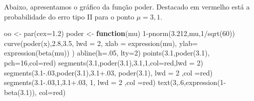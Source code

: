 \documentclass[
  letterpaper,
  DIV=11,
  numbers=noendperiod]{scrartcl}
\newenvironment{Shaded}{\begin{snugshade}}{\end{snugshade}}
\newcommand{\AttributeTok}[1]{\textcolor[rgb]{0.40,0.45,0.13}{#1}}
\newcommand{\ControlFlowTok}[1]{\textcolor[rgb]{0.00,0.23,0.31}{\textbf{#1}}}
\newcommand{\DecValTok}[1]{\textcolor[rgb]{0.68,0.00,0.00}{#1}}
\newcommand{\FloatTok}[1]{\textcolor[rgb]{0.68,0.00,0.00}{#1}}
\newcommand{\FunctionTok}[1]{\textcolor[rgb]{0.28,0.35,0.67}{#1}}
\newcommand{\NormalTok}[1]{\textcolor[rgb]{0.00,0.23,0.31}{#1}}
\newcommand{\OtherTok}[1]{\textcolor[rgb]{0.00,0.23,0.31}{#1}}
\newcommand{\SpecialCharTok}[1]{\textcolor[rgb]{0.37,0.37,0.37}{#1}}
\newcommand{\StringTok}[1]{\textcolor[rgb]{0.13,0.47,0.30}{#1}}
\begin{document}
Abaixo, apresentamos o gráfico da função poder. Destacado em vermelho
está a probabilidade do erro tipo II para o ponto \(\mu=3,1\).

\begin{Shaded}
\begin{Highlighting}[]
\NormalTok{oo }\OtherTok{\textless{}{-}} \FunctionTok{par}\NormalTok{(}\AttributeTok{cex=}\FloatTok{1.2}\NormalTok{)}
\NormalTok{poder }\OtherTok{\textless{}{-}} \ControlFlowTok{function}\NormalTok{(mu) }\DecValTok{1}\SpecialCharTok{{-}}\FunctionTok{pnorm}\NormalTok{(}\FloatTok{3.212}\NormalTok{,mu,}\DecValTok{1}\SpecialCharTok{/}\FunctionTok{sqrt}\NormalTok{(}\DecValTok{60}\NormalTok{))}
\FunctionTok{curve}\NormalTok{(}\FunctionTok{poder}\NormalTok{(x),}\FloatTok{2.8}\NormalTok{,}\FloatTok{3.5}\NormalTok{, }\AttributeTok{lwd =} \DecValTok{2}\NormalTok{, }\AttributeTok{xlab =} \FunctionTok{expression}\NormalTok{(mu), }\AttributeTok{ylab=} \FunctionTok{expression}\NormalTok{(}\FunctionTok{beta}\NormalTok{(mu)) )}
\FunctionTok{abline}\NormalTok{(}\AttributeTok{h=}\NormalTok{.}\DecValTok{05}\NormalTok{, }\AttributeTok{lty=}\DecValTok{2}\NormalTok{)}
\FunctionTok{points}\NormalTok{(}\FloatTok{3.1}\NormalTok{,}\FunctionTok{poder}\NormalTok{(}\FloatTok{3.1}\NormalTok{), }\AttributeTok{pch=}\DecValTok{16}\NormalTok{,}\AttributeTok{col=}\StringTok{\textquotesingle{}red\textquotesingle{}}\NormalTok{)}
\FunctionTok{segments}\NormalTok{(}\FloatTok{3.1}\NormalTok{,}\FunctionTok{poder}\NormalTok{(}\FloatTok{3.1}\NormalTok{),}\FloatTok{3.1}\NormalTok{,}\DecValTok{1}\NormalTok{,}\AttributeTok{col=}\StringTok{\textquotesingle{}red\textquotesingle{}}\NormalTok{,}\AttributeTok{lwd =} \DecValTok{2}\NormalTok{)}
\FunctionTok{segments}\NormalTok{(}\FloatTok{3.1{-}.03}\NormalTok{,}\FunctionTok{poder}\NormalTok{(}\FloatTok{3.1}\NormalTok{),}\FloatTok{3.1+.03}\NormalTok{, }\FunctionTok{poder}\NormalTok{(}\FloatTok{3.1}\NormalTok{), }\AttributeTok{lwd =} \DecValTok{2}\NormalTok{ ,}\AttributeTok{col =}\StringTok{\textquotesingle{}red\textquotesingle{}}\NormalTok{)}
\FunctionTok{segments}\NormalTok{(}\FloatTok{3.1{-}.03}\NormalTok{,}\DecValTok{1}\NormalTok{,}\FloatTok{3.1+.03}\NormalTok{, }\DecValTok{1}\NormalTok{, }\AttributeTok{lwd =} \DecValTok{2}\NormalTok{ ,}\AttributeTok{col =}\StringTok{\textquotesingle{}red\textquotesingle{}}\NormalTok{)}
\FunctionTok{text}\NormalTok{(}\DecValTok{3}\NormalTok{,.}\DecValTok{6}\NormalTok{,}\FunctionTok{expression}\NormalTok{(}\DecValTok{1}\SpecialCharTok{{-}}\FunctionTok{beta}\NormalTok{(}\FloatTok{3.1}\NormalTok{)), }\AttributeTok{col=}\StringTok{\textquotesingle{}red\textquotesingle{}}\NormalTok{)}
\end{Highlighting}
\end{Shaded}
\end{document}
